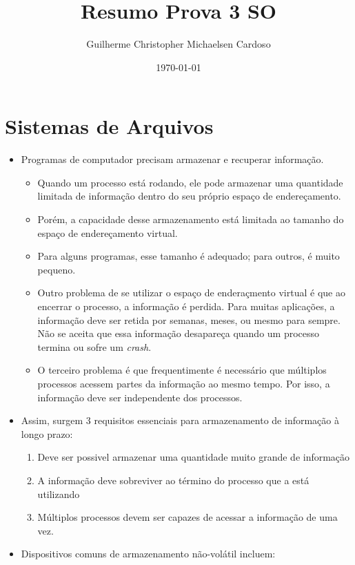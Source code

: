 \documentclass[10pt]{article}
\title{Resumo Prova 3 SO}
\author{Guilherme Christopher Michaelsen Cardoso}
\date{\today}
\begin{document}
\maketitle

\section{Sistemas de Arquivos}
\begin{itemize}
    \item Programas de computador precisam armazenar e recuperar informação.
    \begin{itemize}
        \item Quando um processo está rodando, ele pode armazenar uma quantidade
        limitada de informação dentro do seu próprio espaço de endereçamento.
        \item Porém, a capacidade desse armazenamento está limitada ao tamanho
        do espaço de endereçamento virtual. 
        \item Para alguns programas, esse tamanho é adequado; para outros, é muito
        pequeno.
        \item Outro problema de se utilizar o espaço de enderaçmento virtual é
        que ao encerrar o processo, a informação é perdida. Para muitas aplicações,
        a informação deve ser retida por semanas, meses, ou mesmo para sempre. 
        Não se aceita que essa informação desapareça quando um processo termina ou
        sofre um \textit{crash}.
        \item O terceiro problema é que frequentimente é necessário que múltiplos
        processos acessem partes da informação ao mesmo tempo. Por isso, a informação
        deve ser independente dos processos.
    \end{itemize}
    \item Assim, surgem 3 requisitos essenciais para armazenamento de informação à 
    longo prazo:
    \begin{enumerate}
        \item Deve ser possivel armazenar uma quantidade muito grande de informação
        \item A informação deve sobreviver ao término do processo que a está utilizando
        \item Múltiplos processos devem ser capazes de acessar a informação de uma vez.
    \end{enumerate}
    \item Dispositivos comuns de armazenamento não-volátil incluem:

\end{itemize}
\end{document}
